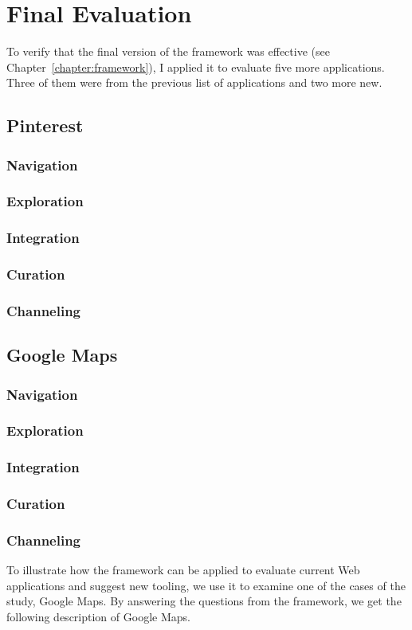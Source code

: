 {\section{Final Evaluation}
To verify that the final version of the framework was effective (see Chapter~\ref{chapter:framework}), I applied it to evaluate five more applications. Three of them were from the previous list of applications and two more new. 

{\subsection{Pinterest}

{\subsubsection{Navigation}}
{\subsubsection{Exploration}}
{\subsubsection{Integration}}
{\subsubsection{Curation}}
{\subsubsection{Channeling}}

} %


{\subsection{Google Maps}
{\subsubsection{Navigation}}
{\subsubsection{Exploration}}
{\subsubsection{Integration}}
{\subsubsection{Curation}}
{\subsubsection{Channeling}}
To illustrate how the framework can be applied to evaluate current Web applications and suggest new tooling, we use it to examine one of the cases of the study, Google Maps. By answering the questions from the framework, we get the following description of Google Maps.

}}
